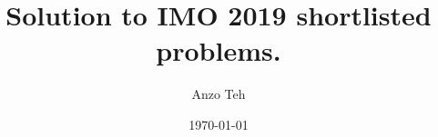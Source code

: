 \documentclass[11pt,a4paper]{article}
\begin{document}
\newcommand{\la}{\leftarrow}
\newcommand{\lra}{\leftrightarrow}
\newcommand{\bbN}{{\mathbb N}}
\newcommand{\bbZ}{{\mathbb Z}}
\newcommand{\bbQ}{{\mathbb Q}}
\newcommand{\bbR}{{\mathbb R}}
\newcommand{\bbC}{{\mathbb C}}
\newcommand{\bbH}{{\mathbb H}}
\newcommand{\dfeq}{\stackrel{\mathrm{def}}{=}}
\newcommand{\ra}{\rightarrow}
\newcommand{\Span}{\mathrm{span}}
\newcommand{\scrP}{\mathscr{P}}
\newcommand{\rank}{\mathrm{rank}}
\newcommand{\nullity}{\mathrm{nullity}}
\newcommand{\Col}{\mathrm{Col}}
\newcommand{\Row}{\mathrm{Row}}
\newcommand{\tr}{\mathrm{tr}}
\newcommand{\ol}{\overline}
\newcommand{\norm}[1]{||#1||}
\newcommand{\doubleline}[1]{\underline{\underline{#1}}}
\newcommand{\elemop}[1]{\stackrel{#1}{\longrightarrow}}
\newcommand{\Ind}{\mathrm{Ind}}
\newcommand{\Res}{\mathrm{Res}}
\newcommand{\End}{\mathrm{End}}
\newcommand{\cl}{\mathrm{cl}}
\newcommand{\code}[1]{\texttt{#1}}
\newcommand\tab[1][0.5cm]{\hspace*{#1}}
\newcommand{\<}{\langle}
\renewcommand{\>}{\rangle}
\newcommand{\qubits}[1]{|{#1}\rangle}
\newcommand{\powset}{\mathcal{P}}
\newcommand{\dsum}{\displaystyle\sum}
\newcommand{\dprod}{\displaystyle\prod}

\title{Solution to IMO 2019 shortlisted problems.}
\author{Anzo Teh}
\date{\today}
\maketitle
\end{document}
